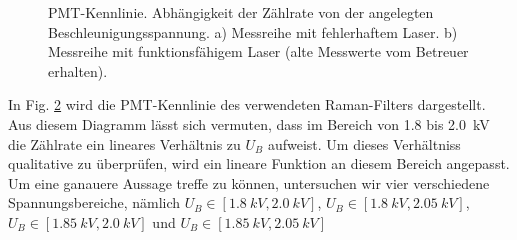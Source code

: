 \documentclass[11pt]{article}
\begin{document}
\begin{figure}[htbp]
    \centering
    \begin{subfigure}{0.45\textwidth}
        \centering
        \caption{}
        \label{fig:fehler}
    \end{subfigure}
    \hfill
    \begin{subfigure}{0.45\textwidth}
        \centering
        \caption{}
        \label{fig:gegeben}
    \end{subfigure}
    \caption{PMT-Kennlinie. Abhängigkeit der Zählrate von der angelegten Beschleunigungsspannung. a) Messreihe mit fehlerhaftem Laser. b) Messreihe mit funktionsfähigem Laser (alte Messwerte vom Betreuer erhalten).}
    \label{fig:PMT_Kennlinie}
\end{figure}

In Fig. \ref{fig:gegeben} wird die PMT-Kennlinie des verwendeten Raman-Filters dargestellt. Aus diesem Diagramm lässt sich vermuten, dass im Bereich von \num{1.8} bis \SI{2.0}{\kilo\volt} die Zählrate ein lineares Verhältnis zu $U_B$ aufweist. Um dieses Verhältniss qualitative zu überprüfen, wird ein lineare Funktion an diesem Bereich angepasst. Um eine ganauere Aussage treffe zu können, untersuchen wir vier verschiedene Spannungsbereiche, nämlich $U_B \in [\SI{1.8}{kV}, \SI{2.0}{kV}]$, $U_B \in [\SI{1.8}{kV}, \SI{2.05}{kV}]$, $U_B \in [\SI{1.85}{kV}, \SI{2.0}{kV}]$ und $U_B \in [\SI{1.85}{kV}, \SI{2.05}{kV}]$
\end{document}
